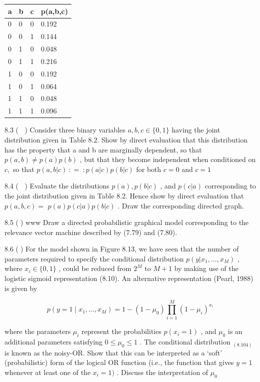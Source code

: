 \documentclass[
  10
]{article}
\newcounter{none} %
\begin{document}
{\def\LTcaptype{none} %
\begin{longtable}[]{@{}|l|l|l|l|@{}}
\toprule\noalign{}
\endhead
\bottomrule\noalign{}
\endlastfoot
\hline
a & b & c & p(a,b,c) \\
\hline
0 & 0 & 0 & 0.192 \\
\hline
0 & 0 & 1 & 0.144 \\
\hline
0 & 1 & 0 & 0.048 \\
\hline
0 & 1 & 1 & 0.216 \\
\hline
1 & 0 & 0 & 0.192 \\
\hline
1 & 0 & 1 & 0.064 \\
\hline
1 & 1 & 0 & 0.048 \\
\hline
1 & 1 & 1 & 0.096 \\
\hline
\end{longtable}
}

8.3 ( ) Consider three binary variables \(a , b , c \in \{ 0 , 1 \}\)
having the joint distribution given in Table 8.2. Show by direct
evaluation that this distribution has the property that a and b are
marginally dependent, so that \(p ( a , b ) \neq p ( a ) p ( b )\) , but
that they become independent when conditioned on \(c ,\) so that
\(p ( a , b | c ) \ : = \ : p ( a | c ) p ( b | c )\) for both \(c = 0\)
and \(c = 1\)

8.4 ( ) Evaluate the distributions \(p ( a ) , p ( b | c )\) , and
\(p ( c | a )\) corresponding to the joint distribution given in Table
8.2. Hence show by direct evaluation that \(p ( a , b , c ) =\)
\(p ( a ) p ( c | a ) p ( b | c )\) . Draw the corresponding directed
graph.

8.5 () www Draw a directed probabilistic graphical model corresponding
to the relevance vector machine described by (7.79) and (7.80).

8.6 () For the model shown in Figure 8.13, we have seen that the number
of parameters required to specify the conditional distribution
\(p ( y | x _ { 1 } , \dots , x _ { M } )\) , where
\(x _ { i } \in \{ 0 , 1 \}\) , could be reduced from \(2 ^ { M }\) to
\(M + 1\) by making use of the logistic sigmoid representation (8.10).
An alternative representation (Pearl, 1988) is given by

\[
p (y = 1 \mid x _ {1}, \dots , x _ {M}) = 1 - (1 - \mu_ {0}) \prod_ {i = 1} ^ {M} (1 - \mu_ {i}) ^ {x _ {i}}\tag{8.104}
\]

where the parameters \(\mu _ { i }\) represent the probabilities
\(p ( x _ { i } = 1 )\) , and \(\mu _ { 0 }\) is an additional
parameters satisfying \(0 \leqslant \mu _ { 0 } \leqslant 1\) . The
conditional distribution \(_ { ( 8 . 1 0 4 ) }\) is known as the
noisy-OR. Show that this can be interpreted as a `soft' (probabilistic)
form of the logical OR function (i.e., the function that gives \(y = 1\)
whenever at least one of the \(x _ { i } = 1 )\) . Discuss the
interpretation of \(\mu _ { 0 }\)
\end{document}
